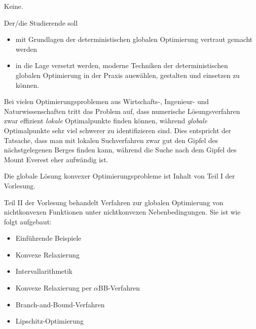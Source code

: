 \begin{course}
\begin{styleenv}
\begin{assessment}
\end{assessment}

\begin{conditions}Keine.\end{conditions}


\end{styleenv}

\begin{learningoutcomes}
Der/die Studierende soll

 \begin{itemize}\item mit Grundlagen der deterministischen globalen Optimierung vertraut gemacht werden  \item in die Lage versetzt werden, moderne Techniken der deterministischen globalen Optimierung in der Praxis auswählen, gestalten und einsetzen zu können.  \end{itemize}
\end{learningoutcomes}

\begin{content}
Bei vielen Optimierungsproblemen aus Wirtschafts-, Ingenieur- und Naturwissenschaften tritt das Problem auf, dass numerische Lösungsverfahren zwar effizient \emph{lokale }Optimalpunkte finden können, während \emph{globale }Optimalpunkte sehr viel schwerer zu identifizieren sind. Dies entspricht der Tatsache, dass man mit lokalen Suchverfahren zwar gut den Gipfel des nächstgelegenen Berges finden kann, während die Suche nach dem Gipfel des Mount Everest eher aufwändig ist.

 

Die globale Lösung konvexer Optimierungsprobleme ist Inhalt von Teil I der Vorlesung.

 

Teil II der Vorlesung behandelt Verfahren zur globalen Optimierung von nichtkonvexen Funktionen unter nichtkonvexen Nebenbedingungen. Sie ist wie folgt aufgebaut:

 \begin{itemize}\item Einführende Beispiele  \item Konvexe Relaxierung  \item Intervallarithmetik  \item Konvexe Relaxierung per $\alpha{}$BB-Verfahren  \item Branch-and-Bound-Verfahren  \item Lipschitz-Optimierung  \end{itemize}


\end{content}
\end{course}
